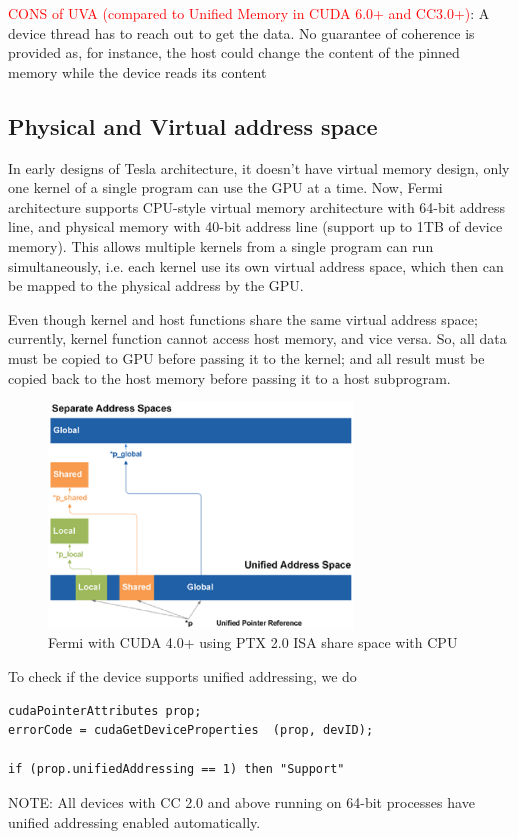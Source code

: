 \textcolor{red}{CONS of UVA (compared to Unified Memory in CUDA 6.0+ and CC3.0+)}:
A device thread has to reach out to get the data. No guarantee of coherence is
provided as, for instance, the host could change the content of the pinned
memory while the device reads its content

   
\subsection{Physical and Virtual address space}
\label{sec:phys-virt-memory}

In early designs of Tesla architecture, it doesn't have virtual memory design,
only one kernel of a single program can use the GPU at a time. Now, Fermi
architecture supports CPU-style virtual memory architecture with 64-bit address
line, and physical memory with 40-bit address line (support up to 1TB of device
memory). This allows multiple kernels from a single program can run
simultaneously, i.e. each kernel use its own virtual address space, which then
can be mapped to the physical address by the GPU.

Even though kernel and host functions share the same virtual address space;
currently, kernel function cannot access host memory, and vice versa. So, all
data must be copied to GPU before passing it to the kernel; and all result must
be copied back to the host memory before passing it to a host subprogram.

\begin{figure}[hbt]
  \centerline{\includegraphics[height=6cm,
    angle=0]{./images/Fermi_unified-address-space.eps}}
  \caption{Fermi with CUDA 4.0+ using PTX 2.0 ISA share space with CPU}
  \label{fig:Fermi-unified-address-space}
\end{figure}


To check if the device supports unified addressing, we do
\begin{verbatim}
cudaPointerAttributes prop;
errorCode = cudaGetDeviceProperties  (prop, devID);

if (prop.unifiedAddressing == 1) then "Support"   
\end{verbatim}
NOTE: All devices with CC 2.0 and above running on 64-bit processes have unified
addressing enabled automatically. 

